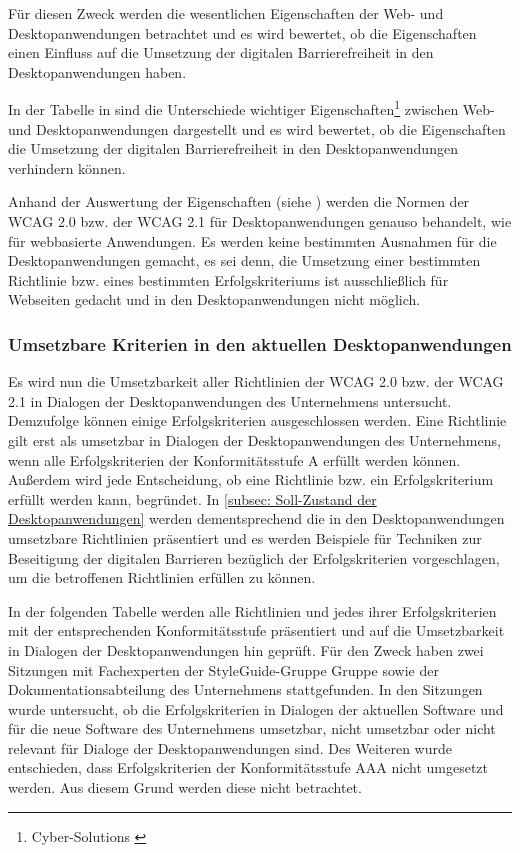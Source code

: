 Für diesen Zweck werden die wesentlichen Eigenschaften der Web- und Desktopanwendungen betrachtet und es wird bewertet, ob die Eigenschaften einen Einfluss auf die Umsetzung der digitalen Barrierefreiheit in den Desktopanwendungen haben.

In der Tabelle in  sind die Unterschiede wichtiger Eigenschaften\footnote{Cyber-Solutions \cite{CyberSolutions}} zwischen Web- und Desktopanwendungen dargestellt und es wird bewertet, ob die Eigenschaften die Umsetzung der digitalen Barrierefreiheit in den Desktopanwendungen verhindern können.

Anhand der Auswertung der Eigenschaften (siehe ) werden die Normen der \ac{WCAG} 2.0 bzw. der \ac{WCAG} 2.1 für Desktopanwendungen genauso behandelt, wie für webbasierte Anwendungen. Es werden keine bestimmten Ausnahmen für die Desktopanwendungen gemacht, es sei denn, die Umsetzung einer bestimmten Richtlinie bzw. eines bestimmten Erfolgskriteriums ist ausschließlich für Webseiten gedacht und in den Desktopanwendungen nicht möglich.

\subsubsection{Umsetzbare Kriterien in den aktuellen Desktopanwendungen}
\label{subsec: Umsetzbare Kriterien}

Es wird nun die Umsetzbarkeit aller Richtlinien der \ac{WCAG} 2.0 bzw. der \ac{WCAG} 2.1 in Dialogen der Desktopanwendungen des Unternehmens untersucht. Demzufolge können einige  Erfolgskriterien ausgeschlossen werden. Eine Richtlinie gilt erst als umsetzbar in Dialogen der Desktopanwendungen des Unternehmens, wenn alle Erfolgskriterien der Konformitätsstufe A erfüllt werden können. Außerdem wird jede Entscheidung, ob eine Richtlinie bzw. ein Erfolgskriterium erfüllt werden kann, begründet. In \cref{subsec: Soll-Zustand der Desktopanwendungen} werden dementsprechend die in den Desktopanwendungen umsetzbare Richtlinien präsentiert und es werden Beispiele für Techniken zur Beseitigung der digitalen Barrieren bezüglich der Erfolgskriterien vorgeschlagen, um die betroffenen Richtlinien erfüllen zu können.

In der folgenden Tabelle werden alle Richtlinien und jedes ihrer Erfolgskriterien mit der entsprechenden Konformitätsstufe präsentiert und auf die Umsetzbarkeit in Dialogen der Desktopanwendungen hin geprüft. Für den Zweck haben zwei Sitzungen mit Fachexperten der StyleGuide-Gruppe Gruppe sowie der Dokumentationsabteilung des Unternehmens stattgefunden. In den Sitzungen wurde untersucht, ob die Erfolgskriterien in Dialogen der aktuellen Software und für die neue Software des Unternehmens umsetzbar, nicht umsetzbar oder nicht relevant für Dialoge der Desktopanwendungen sind. Des Weiteren wurde entschieden, dass Erfolgskriterien der Konformitätsstufe AAA nicht umgesetzt werden. Aus diesem Grund werden diese nicht betrachtet.

